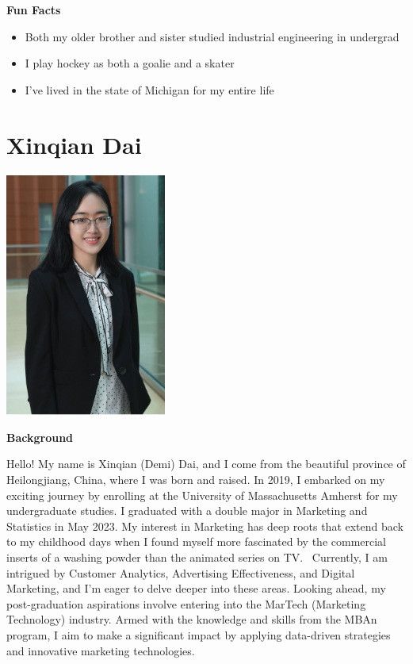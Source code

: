 \documentclass[
]{book}
\begin{document}
\textbf{Fun Facts}

\begin{itemize}
\item
  Both my older brother and sister studied industrial engineering in undergrad
\item
  I play hockey as both a goalie and a skater
\item
  I've lived in the state of Michigan for my entire life
\end{itemize}

\hypertarget{xinqian-dai}{%
\section{Xinqian Dai}\label{xinqian-dai}}

\includegraphics[width=2.08333in,height=\textheight]{Demi Photo.png}

\textbf{Background}

Hello! My name is Xinqian (Demi) Dai, and I come from the beautiful province of Heilongjiang, China, where I was born and raised. In 2019, I embarked on my exciting journey by enrolling at the University of Massachusetts Amherst for my undergraduate studies. I graduated with a double major in Marketing and Statistics in May 2023. My interest in Marketing has deep roots that extend back to my childhood days when I found myself more fascinated by the commercial inserts of a washing powder than the animated series on TV.~ Currently, I am intrigued by Customer Analytics, Advertising Effectiveness, and Digital Marketing, and I'm eager to delve deeper into these areas. Looking ahead, my post-graduation aspirations involve entering into the MarTech (Marketing Technology) industry. Armed with the knowledge and skills from the MBAn program, I aim to make a significant impact by applying data-driven strategies and innovative marketing technologies.
\end{document}
